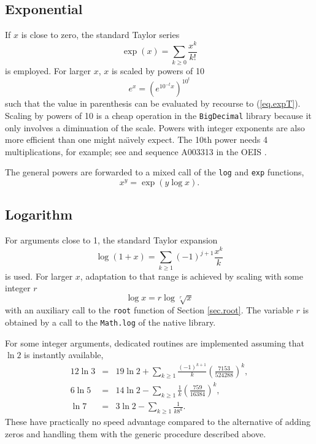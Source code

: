 \documentclass[showpacs,showkeys,amssymb,aps,twocolumn]{revtex4-1}
\begin{document}
\subsection{Exponential}\label{sec.exp}
If $x$ is close to zero, the standard Taylor series \cite[(4.2.1)]{AS}
\begin{equation}
\exp(x) = \sum_{k\ge 0} \frac{x^k}{k!}
\label{eq.expT}
\end{equation}
is employed. For larger $x$, $x$ is scaled by powers of 10
\begin{equation}
e^x=\left( e^{10^{-t}x} \right)^{10^t}
\end{equation}
such that the value in parenthesis can be evaluated by recourse to (\ref{eq.expT}).
Scaling by powers of 10 is a cheap operation in the \texttt{BigDecimal}
library because it only involves a diminuation of the scale.
Powers with integer exponents are also more efficient than one might na\"{\i}vely expect. The
10th power needs 4 multiplications, for example; see \cite{McCarthyMathComp46}
and sequence A003313 in the OEIS \cite{EIS}.

The general powers are forwarded to a mixed call of the \texttt{log}
and \texttt{exp} functions,
\begin{equation}
x^y = \exp( y\log x).
\end{equation}

\subsection{Logarithm}
For arguments close to 1, the standard Taylor expansion
\cite[(4.1.24)]{AS}
\begin{equation}
\log(1+x)=\sum_{k\ge 1}(-1)^{j+1}\frac{x^k}{k}
\end{equation}
is used. For larger $x$, adaptation to that range is achieved by
scaling with some integer $r$
\begin{equation}
\log x = r\log \sqrt[r]x
\end{equation}
with an auxiliary call to the \texttt{root} function of Section \ref{sec.root}.
The variable $r$ is obtained by a call to the \texttt{Math.log} of the
native  library.

For some integer arguments, dedicated routines are implemented assuming
that $\ln 2$ is instantly available,
\begin{eqnarray}
12 \ln 3 &=& 19 \ln 2 +\sum_{k\ge 1}\frac{(-1)^{k+1}}{k}\left(\frac{7153}{524288}\right)^k, \\
6 \ln 5 &=& 14 \ln 2 -\sum_{k\ge 1}\frac{1}{k}\left(\frac{759}{16384}\right)^k, \\
\ln 7 &=& 3 \ln 2 -\sum_{k\ge 1}\frac{1}{k8^k}.
\end{eqnarray}
These have practically no speed advantage compared to the alternative of
adding zeros and handling them with the generic procedure described above.
\end{document}
